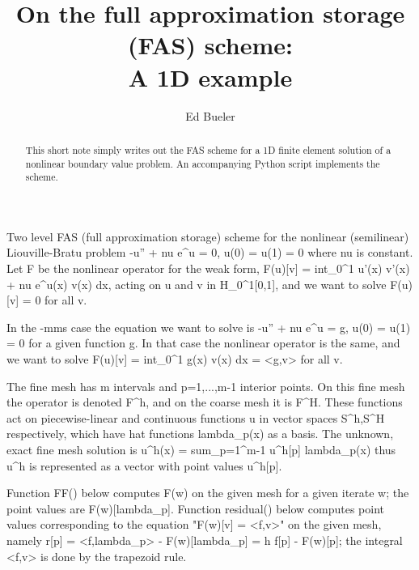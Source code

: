 \documentclass[letterpaper,final,12pt,reqno]{amsart}
\begin{document}
\title[On the full approximation storage (FAS) scheme]{On the full approximation storage (FAS) scheme: \\ A 1D example}

\author{Ed Bueler}

\begin{abstract}  This short note simply writes out the FAS scheme for a 1D finite element solution of a nonlinear boundary value problem.  An accompanying Python script implements the scheme.
\end{abstract}

\maketitle

\thispagestyle{empty}
\bigskip


Two level FAS (full approximation storage) scheme for the nonlinear
(semilinear) Liouville-Bratu problem
  -u'' + nu e^u = 0,  u(0) = u(1) = 0
where nu is constant.  Let F be the nonlinear operator for the weak form,
  F(u)[v] = int_0^1 u'(x) v'(x) + nu e^{u(x)} v(x) dx,
acting on u and v in H_0^1[0,1], and we want to solve
  F(u)[v] = 0
for all v.

In the -mms case the equation we want to solve is
  -u'' + nu e^u = g,  u(0) = u(1) = 0
for a given function g.  In that case the nonlinear operator is the same,
and we want to solve
  F(u)[v] = int_0^1 g(x) v(x) dx = <g,v>
for all v.

The fine mesh has m intervals and p=1,...,m-1 interior points.  On this
fine mesh the operator is denoted F^h, and on the coarse mesh it is F^H.
These functions act on piecewise-linear and continuous functions u in
vector spaces S^h,S^H respectively, which have hat functions
{lambda_p(x)} as a basis.  The unknown, exact fine mesh solution is
  u^h(x) = sum_{p=1}^{m-1} u^h[p] lambda_p(x)
thus u^h is represented as a vector with point values u^h[p].

Function FF() below computes F(w) on the given mesh for a given iterate w;
the point values are F(w)[lambda_p].  Function residual() below computes point
values corresponding to the equation "F(w)[v] = <f,v>" on the given mesh,
namely
  r[p] = <f,lambda_p> - F(w)[lambda_p] = h f[p] - F(w)[p];
the integral <f,v> is done by the trapezoid rule.
\end{document}
